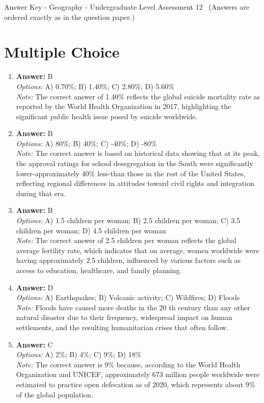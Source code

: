 \documentclass[12pt]{article}
\begin{document}
\begin{center}
Answer Key - Geography - Undergraduate Level Assessment 12 \
\small (Answers are ordered exactly as in the question paper.)
\end{center}

\section*{Multiple Choice}
\begin{enumerate}[label=\arabic*.]
\item \textbf{Answer:} B
\\ \textit{Options:} A) 0.70\%; B) 1.40\%; C) 2.80\%; D) 5.60\%
\\ \textit{Note:} The correct answer of 1.40\% reflects the global suicide mortality rate as reported by the World Health Organization in 2017, highlighting the significant public health issue posed by suicide worldwide.
\item \textbf{Answer:} B
\\ \textit{Options:} A) 80\%; B) 40\%; C) -40\%; D) -80\%
\\ \textit{Note:} The correct answer is based on historical data showing that at its peak, the approval ratings for school desegregation in the South were significantly lower-approximately 40\% less-than those in the rest of the United States, reflecting regional differences in attitudes toward civil rights and integration during that era.
\item \textbf{Answer:} B
\\ \textit{Options:} A) 1.5 children per woman; B) 2.5 children per woman; C) 3.5 children per woman; D) 4.5 children per woman
\\ \textit{Note:} The correct answer of 2.5 children per woman reflects the global average fertility rate, which indicates that on average, women worldwide were having approximately 2.5 children, influenced by various factors such as access to education, healthcare, and family planning.
\item \textbf{Answer:} D
\\ \textit{Options:} A) Earthquakes; B) Volcanic activity; C) Wildfires; D) Floods
\\ \textit{Note:} Floods have caused more deaths in the 20 th century than any other natural disaster due to their frequency, widespread impact on human settlements, and the resulting humanitarian crises that often follow.
\item \textbf{Answer:} C
\\ \textit{Options:} A) 2\%; B) 4\%; C) 9\%; D) 18\%
\\ \textit{Note:} The correct answer is 9\% because, according to the World Health Organization and UNICEF, approximately 673 million people worldwide were estimated to practice open defecation as of 2020, which represents about 9\% of the global population.
\end{enumerate}
\end{document}
